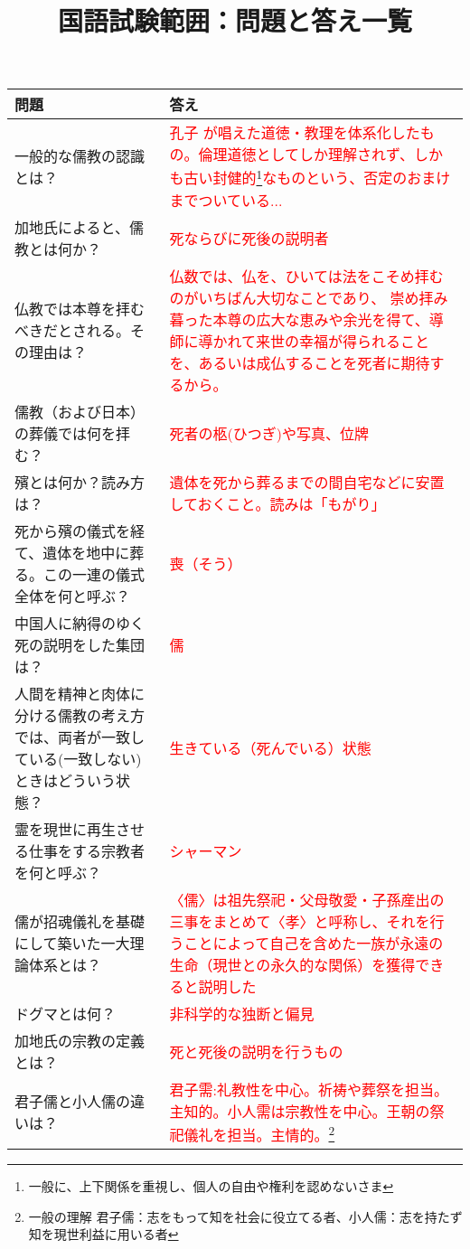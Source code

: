 \documentclass[a4paper,10pt]{article}
\title{国語試験範囲：問題と答え一覧}
\date{}
\begin{document}
\maketitle

\begin{longtable}{|p{}|p{}|}
\hline
\textbf{問題} & \textbf{答え} \\ \hline
一般的な儒教の認識とは？ & \textcolor{red}{孔子 が唱えた道徳・教理を体系化したもの。倫理道徳としてしか理解されず、しかも古い封健的\footnote{一般に、上下関係を重視し、個人の自由や権利を認めないさま}なものという、否定のおまけまでついている...} \\ \hline
加地氏によると、儒教とは何か？ & \textcolor{red}{死ならびに死後の説明者} \\ \hline
仏教では本尊を拝むべきだとされる。その理由は？ & \textcolor{red}{仏数では、仏を、ひいては法をこそめ拝むのがいちばん大切なことであり、
崇め拝み暮った本尊の広大な恵みや余光を得て、導師に導かれて来世の幸福が得られることを、あるいは成仏することを死者に期待するから。} \\ \hline
儒教（および日本）の葬儀では何を拝む？ & \textcolor{red}{死者の柩(ひつぎ)や写真、位牌} \\ \hline
殯とは何か？読み方は？ & \textcolor{red}{遺体を死から葬るまでの間自宅などに安置しておくこと。読みは「もがり」} \\ \hline
死から殯の儀式を経て、遺体を地中に葬る。この一連の儀式全体を何と呼ぶ？ & \textcolor{red}{喪（そう）} \\ \hline
中国人に納得のゆく死の説明をした集団は？ & \textcolor{red}{儒} \\ \hline
人間を精神と肉体に分ける儒教の考え方では、両者が一致している(一致しない)ときはどういう状態？ & \textcolor{red}{生きている（死んでいる）状態} \\ \hline
霊を現世に再生させる仕事をする宗教者を何と呼ぶ？ & \textcolor{red}{シャーマン} \\ \hline
儒が招魂儀礼を基礎にして築いた一大理論体系とは？ & \textcolor{red}{〈儒〉は祖先祭祀・父母敬愛・子孫産出の三事をまとめて〈孝〉と呼称し、それを行うことによって自己を含めた一族が永遠の生命（現世との永久的な関係）を獲得できると説明した} \\ \hline
ドグマとは何？ & \textcolor{red}{非科学的な独断と偏見} \\ \hline
加地氏の宗教の定義とは？ & \textcolor{red}{死と死後の説明を行うもの} \\ \hline
君子儒と小人儒の違いは？ & \textcolor{red}{君子需:礼教性を中心。祈祷や葬祭を担当。主知的。小人需は宗教性を中心。王朝の祭祀儀礼を担当。主情的。\footnote{一般の理解 君子儒：志をもって知を社会に役立てる者、小人儒：志を持たず知を現世利益に用いる者}} \\ \hline

\end{longtable}
\end{document}
